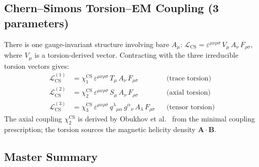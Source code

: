 \documentclass[12pt,a4paper]{article}
\newcommand{\eps}{\varepsilon}       %
\begin{document}
\subsection{Chern--Simons Torsion--EM Coupling (3 parameters)}
\label{sec:chern_simons}

There is one gauge-invariant structure involving bare $A_\mu$:
$\mathcal{L}_{\text{CS}} = \eps^{\mu\nu\rho\sigma}\, V_\mu\, A_\nu\, F_{\rho\sigma}$,
where $V_\mu$ is a torsion-derived vector. Contracting with the
three irreducible torsion vectors gives:
\begin{align}
  \mathcal{L}_{\text{CS}}^{(1)}
    &= \chi^{\text{CS}}_1\, \eps^{\mu\nu\rho\sigma}\, T_\mu\, A_\nu\, F_{\rho\sigma}
    && \text{(trace torsion)} \\
  \mathcal{L}_{\text{CS}}^{(2)}
    &= \chi^{\text{CS}}_2\, \eps^{\mu\nu\rho\sigma}\, S_\mu\, A_\nu\, F_{\rho\sigma}
    && \text{(axial torsion)} \\
  \mathcal{L}_{\text{CS}}^{(3)}
    &= \chi^{\text{CS}}_3\, \eps^{\mu\nu\rho\sigma}\, q^\lambda{}_{\mu\alpha}\, g^{\alpha}{}_{\nu}\,
       A_\lambda\, F_{\rho\sigma}
    && \text{(tensor torsion)}
\end{align}
The axial coupling $\chi^{\text{CS}}_2$ is derived by
Obukhov et al.~\cite{Obukhov:2024ltorsion} from the minimal
coupling prescription; the torsion sources the magnetic helicity
density $\mathbf{A} \cdot \mathbf{B}$.


\subsection{Master Summary}
\label{sec:summary}
\end{document}
